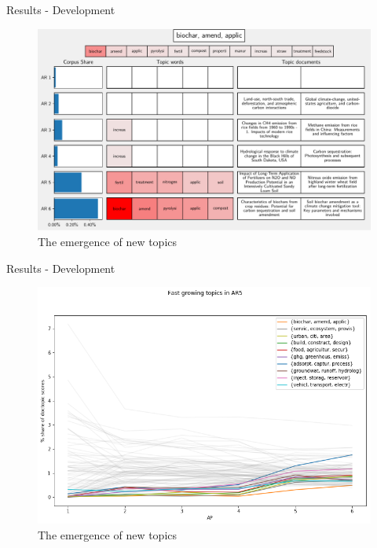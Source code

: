 \documentclass[9pt]{beamer}
\begin{document}
\begin{frame}{Results - Development}

\begin{figure}	
	\includegraphics[width=\linewidth]{../plots/single_topic_3_11020.pdf}
	\caption{The emergence of new topics}
\end{figure}

\end{frame}

\begin{frame}{Results - Development}

\begin{figure}	
	\includegraphics[width=\linewidth]{../plots/ar5_growth_665.png}
	\caption{The emergence of new topics}
\end{figure}

\end{frame}
\end{document}
